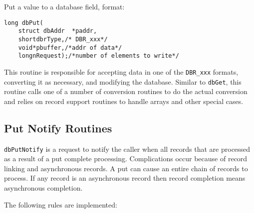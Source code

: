 Put a value to a database field, format:

\begin{verbatim}long dbPut(
    struct dbAddr  *paddr,
    shortdbrType,/* DBR_xxx*/
    void*pbuffer,/*addr of data*/
    longnRequest);/*number of elements to write*/
\end{verbatim}This routine is responsible for accepting data in one of the \verb|DBR_xxx| formats, converting it as necessary, and modifying 
the database. Similar to \verb|dbGet|, this routine calls one of a number of conversion routines to do the actual conversion and 
relies on record support routines to handle arrays and other special cases.

\subsection{Put Notify Routines}

\verb|dbPutNotify| is a request to notify the caller when all records that are processed as a result of a put complete 
processing. Complications occur because of record linking and asynchronous records. A put can cause an entire chain of 
records to process. If any record is an asynchronous record then record completion means asynchronous completion.

The following rules are implemented:


